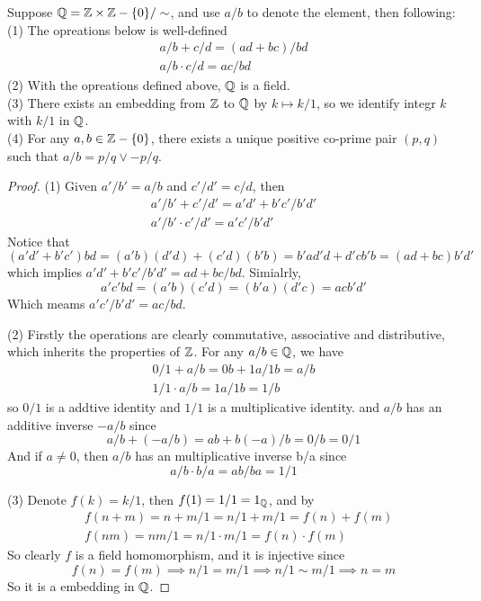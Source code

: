 \documentclass[en,geye,blue,pc,12pt]{elegantnote}
\begin{document}
\begin{proposition}
  Suppose \(\mathbb{Q} = \mathbb{Z}\times \mathbb{Z}-\{0\} /\sim\), and use \(a/b\) to denote the element, then following:
  \\(1) The opreations below is well-defined
  \begin{align*}
    a/b+c/d  = (ad + bc) /bd\\
    a/b \cdot c/d = ac/bd
  \end{align*}
  (2) With the opreations defined above, \(\mathbb{Q}\) is a field.
  \\(3) There exists an embedding from \(\mathbb{Z}\) to \(\mathbb{Q}\) by \(k \mapsto k/1\), so we identify integr \(k\) with \(k/1\) in \(\mathbb{Q}\).
  \\(4) For any \(a,b \in \mathbb{Z}-\{0\}\), there exists a unique positive co-prime pair \((p,q)\) such that \(a/b = p/q \lor -p/q \). 

  \begin{proof}
    (1) Given \(a'/b' = a/b\) and \(c'/d' = c/d \), then 
    \begin{align*}
      a'/b'+c'/d'  = a'd' + b'c' /b'd'\\
      a'/b' \cdot c'/d' = a'c'/b'd'
    \end{align*}
    Notice that \[(a'd'+b'c')bd = (a'b)(d'd)+(c'd)(b'b) = b'ad'd+d'cb'b=(ad+bc)b'd'\] which implies \(a'd'+b'c'/b'd' = ad+bc/bd\). Simialrly, \[a'c'bd = (a'b)(c'd) = (b'a)(d'c)  = acb'd'\]
    Which meams \(a'c'/b'd' = ac/bd\).

    (2) Firstly the operations are clearly commutative, associative and distributive, which inherits the properties of \(\mathbb{Z} \). For any \(a/b \in \mathbb{Q}\), we have \begin{align*}
      0/1+a/b = 0b+1a/1b = a/b \\
      1/1 \cdot a/b =1a/1b = 1/b
    \end{align*}
    so \(0/1\) is a addtive identity and \(1/1\) is a multiplicative identity. and \(a/b\) has an additive inverse \(-a/b\) since
    \[a/b+(-a/b) = ab+b(-a)/b = 0/b = 0/1\]
    And if \(a \neq 0\), then \(a/b\) has an multiplicative inverse b/a since
    \[a/b \cdot b/a = ab/ba = 1/1\]

    (3) Denote \(f(k) = k/1\), then \(f(1) = 1/1 = 1_{\mathbb{Q}}\), and by
    \begin{align*}
      &f(n+m) = n+m/1 = n/1 +m/1 = f(n)+f(m) \\
      &f(nm) = nm/1 = n/1\cdot m/1 = f(n)\cdot f(m) 
    \end{align*}
    So clearly \(f\) is a field homomorphism, and it is injective since
    \[f(n) = f(m) \implies n/1 =m/1 \implies n/1 \sim m/1 \implies n = m\]
    So it is a embedding in \(\mathbb{Q}\).


\end{proof}
\end{proposition}
\end{document}
